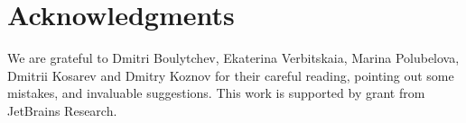 \section*{Acknowledgments}

We are grateful to Dmitri Boulytchev, Ekaterina Verbitskaia, Marina Polubelova, Dmitrii Kosarev and Dmitry Koznov for their careful reading, pointing out some mistakes, and invaluable suggestions.
This work is supported by grant from JetBrains Research.